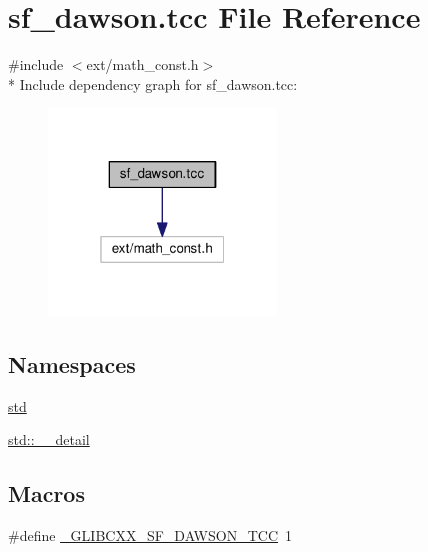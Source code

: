 \hypertarget{sf__dawson_8tcc}{}\section{sf\+\_\+dawson.\+tcc File Reference}
\label{sf__dawson_8tcc}
{\ttfamily \#include $<$ext/math\+\_\+const.\+h$>$}\\*
Include dependency graph for sf\+\_\+dawson.\+tcc\+:\nopagebreak
\begin{figure}[H]
\begin{center}
\leavevmode
\includegraphics[width=172pt]{sf__dawson_8tcc__incl}
\end{center}
\end{figure}
\subsection*{Namespaces}
\begin{DoxyCompactItemize}
\item 
 \hyperlink{namespacestd}{std}
\item 
 \hyperlink{namespacestd_1_1____detail}{std\+::\+\_\+\+\_\+detail}
\end{DoxyCompactItemize}
\subsection*{Macros}
\begin{DoxyCompactItemize}
\item 
\#define \hyperlink{sf__dawson_8tcc_a72d0ce5cd51240da4fb2546e640923de}{\+\_\+\+G\+L\+I\+B\+C\+X\+X\+\_\+\+S\+F\+\_\+\+D\+A\+W\+S\+O\+N\+\_\+\+T\+C\+C}~1
\end{DoxyCompactItemize}
